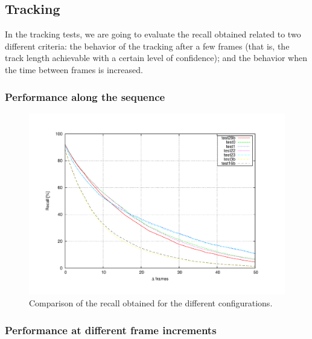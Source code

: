 \subsection{Tracking}\label{ch:chapter04_02_03}

In the tracking tests, we are going to evaluate the recall obtained related to two different criteria: the behavior of the tracking after a few frames (that is, the track length achievable with a certain level of confidence); and the behavior when the time between frames is increased. 

\subsubsection{Performance along the sequence}\label{ch:chapter04_02_03_01}


\begin{figure}[h!]
\centering
\includegraphics[trim=50 40 80 60,clip]{recall_vs_delta_frames}
\caption{Comparison of the recall obtained for the different configurations.}\label{fig:cp04_recall_vs_delta_frames}
\end{figure}

\subsubsection{Performance at different frame increments}\label{ch:chapter04_02_03_02}



